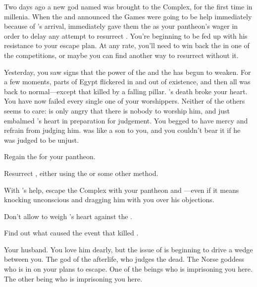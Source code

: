 \documentclass[char]{guardians}
\begin{document}

Two days ago a new god named \cUnity{} was brought to the Complex, for the first time in millenia. When the \cWarden{} and \cCaretaker{} announced the Games were going to be help immediately because of \cUnity{}'s arrival, \cOsiris{} immediately gave them the \iNecro{\MYname} as your pantheon's wager in order to delay any attempt to resurrect \cSet{}. You're beginning to be fed up with his resistance to your escape plan. At any rate, you'll need to win back the \iNecro{\MYname} in one of the competitions, or maybe you can find another way to resurrect \cSet{} without it.

Yesterday, you saw signs that the power of the \cWarden{} and the \cCaretaker{} has begun to weaken. For a few moments, parts of Egypt flickered in and out of existence, and then all was back to normal---except that \cEgyptianHuman{} killed by a falling pillar. \cEgyptianHuman{}'s death broke your heart. You have now failed every single one of your worshippers. Neither of the others seems to care: \cOsiris{} is only angry that there is nobody to worship him, and \cAnubis{} just embalmed \cEgyptianHuman{}'s heart in preparation for judgement. You begged \cAnubis{} to have mercy and refrain from judging him. \cEgyptianHuman{} was like a son to you, and you couldn't bear it if he was judged to be unjust.


\begin{itemz}[Goals]
  \item Regain the \iNecro{} for your pantheon.
  \item Resurrect \cSet{}, either using the \iNecro{\MYname} or some other method.
  \item With \cSet{}'s help, escape the Complex with your pantheon and \cHel{}---even if it means knocking \cOsiris{} unconscious and dragging him with you over his objections.
  \item Don't allow \cAnubis{} to weigh \cEgyptianHuman{}'s heart against the \iFeather{\MYname}.
  \item Find out what caused the event that killed \cEgyptianHuman{}.
\end{itemz}

\begin{contacts}
  \contact{\cOsiris{}} Your husband. You love him dearly, but the issue of \cSet{} is beginning to drive a wedge between you.
  \contact{\cAnubis{}} The god of the afterlife, who judges the dead.
  \contact{\cHel{}} The Norse goddess who is in on your plans to escape.
  \contact{\cCaretaker{}} One of the beings who is imprisoning you here.
  \contact{\cWarden{}} The other being who is imprisoning you here.
\end{contacts}
\end{document}
